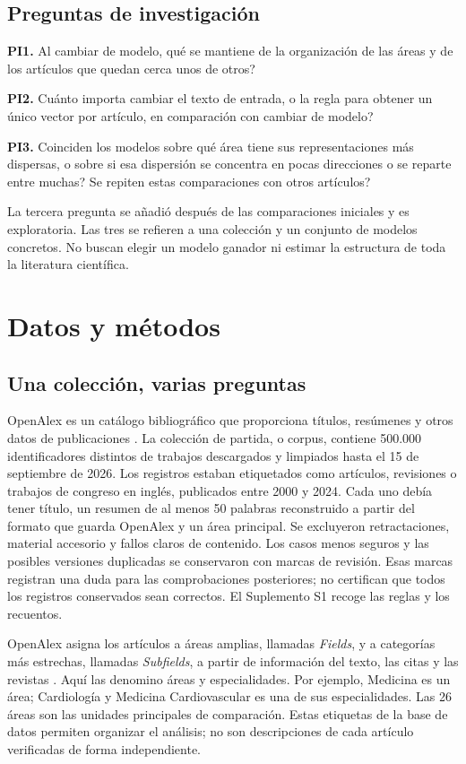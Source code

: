 \documentclass[12pt]{article}
\begin{document}
\subsection{Preguntas de investigación}
\textbf{PI1.} Al cambiar de modelo, \textquestiondown{}qué se mantiene de la organización de las áreas y de los artículos que quedan cerca unos de otros?

\textbf{PI2.} \textquestiondown{}Cuánto importa cambiar el texto de entrada, o la regla para obtener un único vector por artículo, en comparación con cambiar de modelo?

\textbf{PI3.} \textquestiondown{}Coinciden los modelos sobre qué área tiene sus representaciones más dispersas, o sobre si esa dispersión se concentra en pocas direcciones o se reparte entre muchas? \textquestiondown{}Se repiten estas comparaciones con otros artículos?

La tercera pregunta se añadió después de las comparaciones iniciales y es exploratoria. Las tres se refieren a una colección y un conjunto de modelos concretos. No buscan elegir un modelo ganador ni estimar la estructura de toda la literatura científica.

\section{Datos y métodos}
\subsection{Una colección, varias preguntas}
OpenAlex es un catálogo bibliográfico que proporciona títulos, resúmenes y otros datos de publicaciones \citep{priem2022openalex}. La colección de partida, o corpus, contiene 500.000 identificadores distintos de trabajos descargados y limpiados hasta el 15 de septiembre de 2026. Los registros estaban etiquetados como artículos, revisiones o trabajos de congreso en inglés, publicados entre 2000 y 2024. Cada uno debía tener título, un resumen de al menos 50 palabras reconstruido a partir del formato que guarda OpenAlex y un área principal. Se excluyeron retractaciones, material accesorio y fallos claros de contenido. Los casos menos seguros y las posibles versiones duplicadas se conservaron con marcas de revisión. Esas marcas registran una duda para las comprobaciones posteriores; no certifican que todos los registros conservados sean correctos. El Suplemento S1 recoge las reglas y los recuentos.

OpenAlex asigna los artículos a áreas amplias, llamadas \emph{Fields}, y a categorías más estrechas, llamadas \emph{Subfields}, a partir de información del texto, las citas y las revistas \citep{openalex2026topics}. Aquí las denomino áreas y especialidades. Por ejemplo, Medicina es un área; Cardiología y Medicina Cardiovascular es una de sus especialidades. Las 26 áreas son las unidades principales de comparación. Estas etiquetas de la base de datos permiten organizar el análisis; no son descripciones de cada artículo verificadas de forma independiente.
\end{document}
